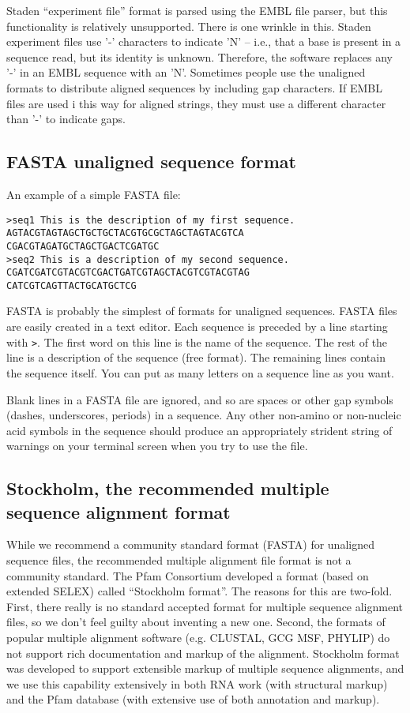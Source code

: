 Staden ``experiment file'' format is parsed using the EMBL file
parser, but this functionality is relatively unsupported. There is one
wrinkle in this. Staden experiment files use '-' characters to
indicate 'N' -- i.e., that a base is present in a sequence read, but
its identity is unknown. Therefore, the software replaces any '-' in
an EMBL sequence with an 'N'. Sometimes people use the unaligned
formats to distribute aligned sequences by including gap
characters. If EMBL files are used i this way for aligned strings,
they must use a different character than '-' to indicate gaps.

\subsection{FASTA unaligned sequence format}

An example of a simple FASTA file: 

\begin{verbatim}
>seq1 This is the description of my first sequence.
AGTACGTAGTAGCTGCTGCTACGTGCGCTAGCTAGTACGTCA
CGACGTAGATGCTAGCTGACTCGATGC
>seq2 This is a description of my second sequence.
CGATCGATCGTACGTCGACTGATCGTAGCTACGTCGTACGTAG
CATCGTCAGTTACTGCATGCTCG
\end{verbatim}

FASTA is probably the simplest of formats for unaligned sequences.
FASTA files are easily created in a text editor.  Each sequence is
preceded by a line starting with \verb+>+. The first word on this line
is the name of the sequence. The rest of the line is a description of
the sequence (free format). The remaining lines contain the sequence
itself. You can put as many letters on a sequence line as you want.

Blank lines in a FASTA file are ignored, and so are spaces or other
gap symbols (dashes, underscores, periods) in a sequence. Any other
non-amino or non-nucleic acid symbols in the sequence should produce
an appropriately strident string of warnings on your terminal screen
when you try to use the file.


\subsection{Stockholm, the recommended multiple sequence alignment format}

While we recommend a community standard format (FASTA) for unaligned
sequence files, the recommended multiple alignment file format is not
a community standard.  The Pfam Consortium developed a format (based
on extended SELEX) called ``Stockholm format''.  The reasons for this
are two-fold. First, there really is no standard accepted format for
multiple sequence alignment files, so we don't feel guilty about
inventing a new one. Second, the formats of popular multiple alignment
software (e.g. CLUSTAL, GCG MSF, PHYLIP) do not support rich
documentation and markup of the alignment.  Stockholm format was
developed to support extensible markup of multiple sequence
alignments, and we use this capability extensively in both RNA work
(with structural markup) and the Pfam database (with extensive use of
both annotation and markup).

